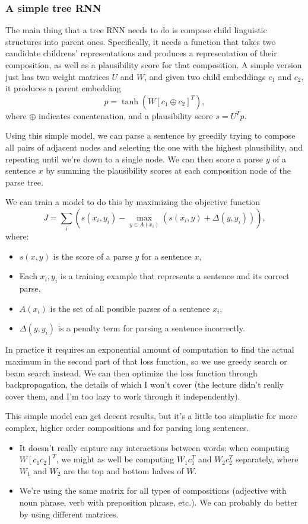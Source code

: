 \subsubsection{A simple tree RNN}
The main thing that a tree RNN needs to do is compose child linguistic structures into parent ones. Specifically, it needs a function that takes two candidate childrens' representations and produces a representation of their composition, as well as a plausibility score for that composition. A simple version just has two weight matrices $U$ and $W$, and given two child embeddings $c_1$ and $c_2$, it produces a parent embedding
$$p = \tanh\left(W\left[c_1 \oplus c_2\right]^T\right),$$
where $\oplus$ indicates concatenation, and a plausibility score $s = U^Tp$.

Using this simple model, we can parse a sentence by greedily trying to compose all pairs of adjacent nodes and selecting the one with the highest plausibility, and repeating until we're down to a single node. We can then score a parse $y$ of a sentence $x$ by summing the plausibility scores at each composition node of the parse tree.

We can train a model to do this by maximizing the objective function
$$J = \sum_i\left( s(x_i, y_i) - \max_{y \in A(x_i)}\left(s(x_i, y) + \Delta(y, y_i)\right)\right),$$
where:
\begin{itemize}
\item $s(x, y)$ is the score of a parse $y$ for a sentence $x$,
\item Each $x_i, y_i$ is a training example that represents a sentence and its correct parse,
\item $A(x_i)$ is the set of all possible parses of a sentence $x_i$,
\item $\Delta(y, y_i)$ is a penalty term for parsing a sentence incorrectly.
\end{itemize}
In practice it requires an exponential amount of computation to find the actual maximum in the second part of that loss function, so we use greedy search or beam search instead. We can then optimize the loss function through backpropagation, the details of which I won't cover (the lecture didn't really cover them, and I'm too lazy to work through it independently).

This simple model can get decent results, but it's a little too simplistic for more complex, higher order compositions and for parsing long sentences.
\begin{itemize}
\item It doesn't really capture any interactions between words: when computing $W\left[c_1 c_2\right]^T$, we might as well be computing $W_1c_1^T$ and $W_2c_2^T$ separately, where $W_1$ and $W_2$ are the top and bottom halves of $W$.
\item We're using the same matrix for all types of compositions (adjective with noun phrase, verb with preposition phrase, etc.). We can probably do better by using different matrices.
\end{itemize}

